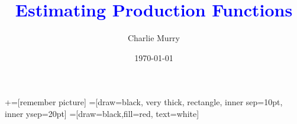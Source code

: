 \documentclass[11pt, aspectratio=169]{beamer}
\title[]{\textcolor{blue}{Estimating Production Functions}}
\author[CM]{Charlie Murry}
\institute{Boston College}
\date{\today}
\begin{document}
\newcommand\marktopleft[1]{%
    \tikz[overlay,remember picture] 
        \node (marker-#1-a) at (-.3em,.3em) {};%
}
\newcommand\markbottomright[2]{%
    \tikz[overlay,remember picture] 
        \node (marker-#1-b) at (0em,0em) {};%
}
+=[remember picture] 
 =[draw=black, very thick, rectangle, inner sep=10pt, inner ysep=20pt]
 =[draw=black,fill=red, text=white]

\begin{frame}
\maketitle
\end{frame}

\end{document}
